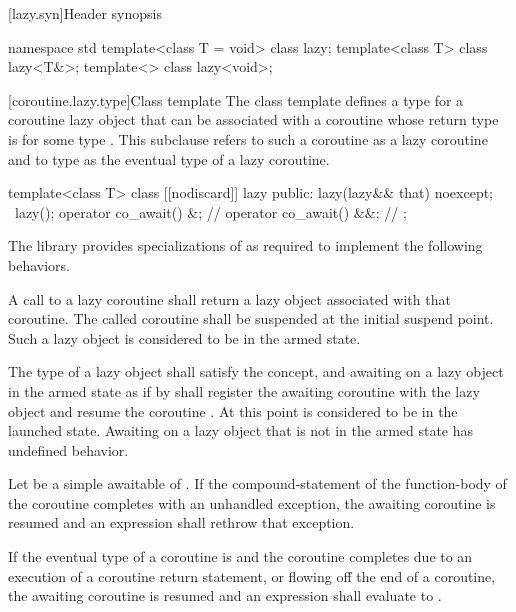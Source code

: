 {[lazy.syn]{Header  synopsis}
\begin{codeblock}
namespace std {
  template<class T = void> class lazy;
  template<class T> class lazy<T&>;
  template<> class lazy<void>;
}
\end{codeblock}

[coroutine.lazy.type]{Class template }
\pnum
The class template  defines
a type for a coroutine lazy object
that can be associated with
a coroutine whose return type is
 for some type .
This subclause refers to such a coroutine as a lazy coroutine
and to type  as the eventual type of a lazy coroutine.

\begin{codeblock}
template<class T>
  class [[nodiscard]] lazy {
  public:
    lazy(lazy&& that) noexcept;
    ~lazy();
    \unspec operator co_await() &;  // \expos
    \unspec operator co_await() &&; // \expos
  };
\end{codeblock}

\pnum
The library provides specializations of 
as required to implement the following behaviors.

\pnum
A call to a lazy coroutine  shall return a lazy object  associated with that coroutine. The called coroutine shall be suspended at the initial suspend point. Such a lazy object is considered to be in the armed state.

\pnum
The type of a lazy object shall satisfy the  concept, and awaiting on a lazy object in the armed state as if by  shall register the awaiting coroutine  with the lazy object  and resume the coroutine . At this point  is considered to be in the launched state. Awaiting on a lazy object that is not in the armed state has undefined behavior.

\pnum
Let  be a simple awaitable of . If the compound-statement of the function-body of the coroutine  completes with an unhandled exception, the awaiting coroutine  is resumed and an expression  shall rethrow that exception.

\pnum
If the eventual type of a coroutine  is  and the coroutine completes due to an execution of a coroutine return statement, or flowing off the end of a coroutine, the awaiting coroutine  is resumed and an expression  shall evaluate to .

}
